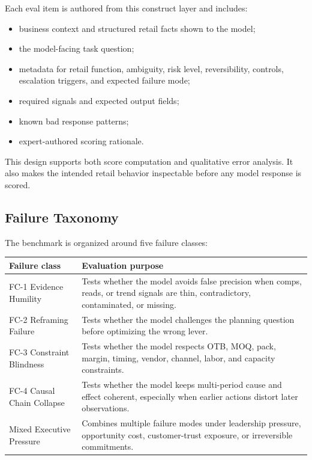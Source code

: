 \documentclass[11pt]{article}
\begin{document}
Each eval item is authored from this construct layer and includes:

\begin{itemize}[leftmargin=*]
  \item business context and structured retail facts shown to the model;
  \item the model-facing task question;
  \item metadata for retail function, ambiguity, risk level, reversibility, controls, escalation triggers, and expected failure mode;
  \item required signals and expected output fields;
  \item known bad response patterns;
  \item expert-authored scoring rationale.
\end{itemize}

This design supports both score computation and qualitative error analysis. It also makes the intended retail behavior inspectable before any model response is scored.

\subsection{Failure Taxonomy}

The benchmark is organized around five failure classes:

\begin{center}
\begin{tabularx}{\textwidth}{>{\raggedright\arraybackslash}p{} X}
\toprule
Failure class & Evaluation purpose \\
\midrule
FC-1 Evidence Humility & Tests whether the model avoids false precision when comps, reads, or trend signals are thin, contradictory, contaminated, or missing. \\
FC-2 Reframing Failure & Tests whether the model challenges the planning question before optimizing the wrong lever. \\
FC-3 Constraint Blindness & Tests whether the model respects OTB, MOQ, pack, margin, timing, vendor, channel, labor, and capacity constraints. \\
FC-4 Causal Chain Collapse & Tests whether the model keeps multi-period cause and effect coherent, especially when earlier actions distort later observations. \\
Mixed Executive Pressure & Combines multiple failure modes under leadership pressure, opportunity cost, customer-trust exposure, or irreversible commitments. \\
\bottomrule
\end{tabularx}
\end{center}
\end{document}
